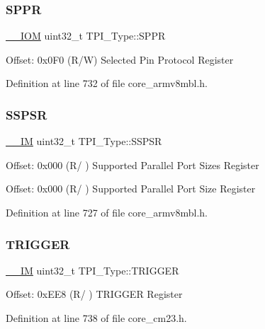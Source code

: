 \subsubsection{\texorpdfstring{S\+P\+PR}{SPPR}}
{\footnotesize\ttfamily \hyperlink{core__sc300_8h_ab6caba5853a60a17e8e04499b52bf691}{\+\_\+\+\_\+\+I\+OM} uint32\+\_\+t T\+P\+I\+\_\+\+Type\+::\+S\+P\+PR}

Offset\+: 0x0\+F0 (R/W) Selected Pin Protocol Register 

Definition at line 732 of file core\+\_\+armv8mbl.\+h.

\mbox{\label{struct_t_p_i___type_a037901d7cb870199ac51d9ad0ef9fd1a}} 
\subsubsection{\texorpdfstring{S\+S\+P\+SR}{SSPSR}}
{\footnotesize\ttfamily \hyperlink{core__sc300_8h_a4cc1649793116d7c2d8afce7a4ffce43}{\+\_\+\+\_\+\+IM} uint32\+\_\+t T\+P\+I\+\_\+\+Type\+::\+S\+S\+P\+SR}

Offset\+: 0x000 (R/ ) Supported Parallel Port Sizes Register

Offset\+: 0x000 (R/ ) Supported Parallel Port Size Register 

Definition at line 727 of file core\+\_\+armv8mbl.\+h.

\mbox{\label{struct_t_p_i___type_a4d4cd2357f72333a82a1313228287bbd}} 
\subsubsection{\texorpdfstring{T\+R\+I\+G\+G\+ER}{TRIGGER}}
{\footnotesize\ttfamily \hyperlink{core__sc300_8h_a4cc1649793116d7c2d8afce7a4ffce43}{\+\_\+\+\_\+\+IM} uint32\+\_\+t T\+P\+I\+\_\+\+Type\+::\+T\+R\+I\+G\+G\+ER}

Offset\+: 0x\+E\+E8 (R/ ) T\+R\+I\+G\+G\+ER Register 

Definition at line 738 of file core\+\_\+cm23.\+h.

\mbox{\label{struct_t_p_i___type_a01972f64f408cec28320780ca067b142}} 
